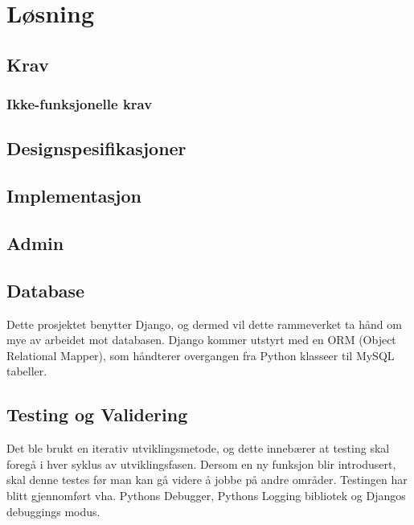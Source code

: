 \chapter{Løsning}

\section{Krav}
\subsection{Ikke-funksjonelle krav}

\section{Designspesifikasjoner}



\section{Implementasjon}









\clearpage
\section{Admin}

\clearpage
\section{Database}
Dette prosjektet benytter Django, og dermed vil dette rammeverket ta hånd om mye av arbeidet mot databasen. Django kommer utstyrt med en ORM (Object Relational Mapper), som håndterer overgangen fra Python klasseer til MySQL tabeller. 

\clearpage
\section{Testing og Validering}
Det ble brukt en iterativ utviklingsmetode, og dette innebærer at testing skal foregå i hver syklus av utviklingsfasen. Dersom en ny funksjon blir introdusert, skal denne testes før man kan gå videre å jobbe på andre områder. Testingen har blitt gjennomført vha. Pythons Debugger, Pythons Logging bibliotek og Djangos debuggings modus.



